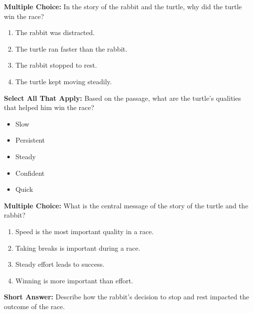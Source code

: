 \documentclass[12pt]{article}
\begin{document}
\begin{tcolorbox}[colframe=black!50, colback=white, title=Question 6]
\textbf{Multiple Choice:} In the story of the rabbit and the turtle, why did the turtle win the race?

\begin{enumerate}[label=(\Alph*)]
\item The rabbit was distracted.
\item The turtle ran faster than the rabbit.
\item The rabbit stopped to rest.
\item The turtle kept moving steadily.
\end{enumerate}
\end{tcolorbox}

\begin{tcolorbox}[colframe=black!50, colback=white, title=Question 7]
\textbf{Select All That Apply:} Based on the passage, what are the turtle's qualities that helped him win the race?
\begin{itemize}
\item Slow
\item Persistent
\item Steady
\item Confident
\item Quick
\end{itemize}
\end{tcolorbox}

\begin{tcolorbox}[colframe=black!50, colback=white, title=Question 8]
\textbf{Multiple Choice:} What is the central message of the story of the turtle and the rabbit?
\begin{enumerate}[label=(\Alph*)]
\item Speed is the most important quality in a race.
\item Taking breaks is important during a race.
\item Steady effort leads to success.
\item Winning is more important than effort.
\end{enumerate}
\end{tcolorbox}

\begin{tcolorbox}[colframe=black!50, colback=white, title=Question 9]
\textbf{Short Answer:} Describe how the rabbit’s decision to stop and rest impacted the outcome of the race.

\vspace{1em}
\underline{\hspace{15.8cm}}  
    \\[0.8cm] \underline{\hspace{15.8cm}}  
 
\end{tcolorbox}
\end{document}
